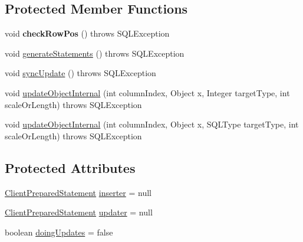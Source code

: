 \subsection*{Protected Member Functions}
\begin{DoxyCompactItemize}
\item 
\mbox{\label{classcom_1_1mysql_1_1cj_1_1jdbc_1_1result_1_1_updatable_result_set_a6dd13b06ca291576ff709fb62451637a}} 
void {\bfseries check\+Row\+Pos} ()  throws S\+Q\+L\+Exception 
\item 
void \mbox{\hyperlink{classcom_1_1mysql_1_1cj_1_1jdbc_1_1result_1_1_updatable_result_set_ab31166ae9f37bf7b23648d7565f345d1}{generate\+Statements}} ()  throws S\+Q\+L\+Exception 
\item 
void \mbox{\hyperlink{classcom_1_1mysql_1_1cj_1_1jdbc_1_1result_1_1_updatable_result_set_aa98341ec11939c41a5cd519d23fb055e}{sync\+Update}} ()  throws S\+Q\+L\+Exception 
\item 
void \mbox{\hyperlink{classcom_1_1mysql_1_1cj_1_1jdbc_1_1result_1_1_updatable_result_set_a65af746cb788d9ddadcf675f0b96023b}{update\+Object\+Internal}} (int column\+Index, Object x, Integer target\+Type, int scale\+Or\+Length)  throws S\+Q\+L\+Exception 
\item 
void \mbox{\hyperlink{classcom_1_1mysql_1_1cj_1_1jdbc_1_1result_1_1_updatable_result_set_a9cfc113a3778b67ce042e97c205c4b98}{update\+Object\+Internal}} (int column\+Index, Object x, S\+Q\+L\+Type target\+Type, int scale\+Or\+Length)  throws S\+Q\+L\+Exception 
\end{DoxyCompactItemize}
\subsection*{Protected Attributes}
\begin{DoxyCompactItemize}
\item 
\mbox{\hyperlink{classcom_1_1mysql_1_1cj_1_1jdbc_1_1_client_prepared_statement}{Client\+Prepared\+Statement}} \mbox{\hyperlink{classcom_1_1mysql_1_1cj_1_1jdbc_1_1result_1_1_updatable_result_set_a0296181dd8c57b0ac49ca09e01cfd033}{inserter}} = null
\item 
\mbox{\hyperlink{classcom_1_1mysql_1_1cj_1_1jdbc_1_1_client_prepared_statement}{Client\+Prepared\+Statement}} \mbox{\hyperlink{classcom_1_1mysql_1_1cj_1_1jdbc_1_1result_1_1_updatable_result_set_a9102f47e2a47b392b64e246fdf8a0640}{updater}} = null
\item 
boolean \mbox{\hyperlink{classcom_1_1mysql_1_1cj_1_1jdbc_1_1result_1_1_updatable_result_set_a6ebd846a7eac89f8ba9aec9523889003}{doing\+Updates}} = false
\end{DoxyCompactItemize}


